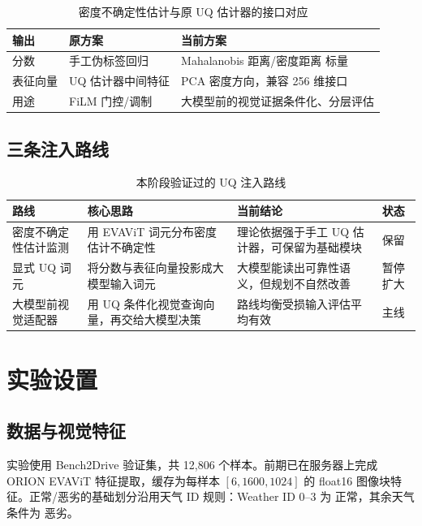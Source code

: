 \documentclass[12pt, a4paper]{ctexart}
\begin{document}
\begin{table}[H]
\centering
\caption{密度不确定性估计与原 UQ 估计器的接口对应}
\begin{tabular}{lll}
\toprule
\textbf{输出} & \textbf{原方案} & \textbf{当前方案} \\
\midrule
分数 & 手工伪标签回归 & Mahalanobis 距离/密度距离 标量 \\
表征向量 & UQ 估计器中间特征 & PCA 密度方向，兼容 256 维接口 \\
用途 & FiLM 门控/调制 & 大模型前的视觉证据条件化、分层评估 \\
\bottomrule
\end{tabular}
\end{table}

\subsection{三条注入路线}

\begin{table}[H]
\centering
\caption{本阶段验证过的 UQ 注入路线}
\small
\begin{tabular}{p{2.8cm}p{4.9cm}p{4.1cm}p{1.5cm}}
\toprule
\textbf{路线} & \textbf{核心思路} & \textbf{当前结论} & \textbf{状态} \\
\midrule
密度不确定性估计监测 & 用 EVAViT 词元分布密度估计不确定性 & 理论依据强于手工 UQ 估计器，可保留为基础模块 & 保留 \\
显式 UQ 词元 & 将分数与表征向量投影成大模型输入词元 & 大模型能读出可靠性语义，但规划不自然改善 & 暂停扩大 \\
大模型前视觉适配器 & 用 UQ 条件化视觉查询向量，再交给大模型决策 & 路线均衡受损输入评估平均有效 & 主线 \\
\bottomrule
\end{tabular}
\end{table}

\section{实验设置}

\subsection{数据与视觉特征}

实验使用 Bench2Drive 验证集\cite{jia2024bench2drive}，共 12,806 个样本。前期已在服务器上完成 ORION EVAViT 特征提取，缓存为每样本 $[6,1600,1024]$ 的 float16 图像块特征。正常/恶劣的基础划分沿用天气 ID 规则：Weather ID $0$--$3$ 为 正常，其余天气条件为 恶劣。
\end{document}
